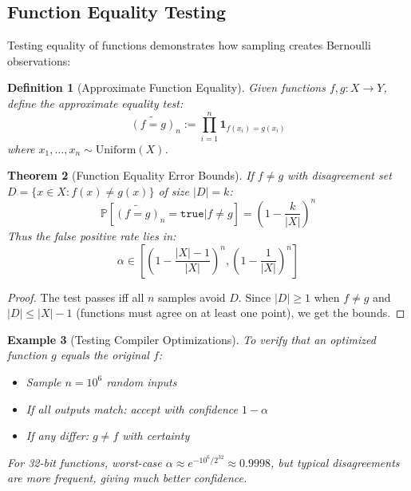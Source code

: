 \documentclass[11pt,final,hidelinks]{article}
\newtheorem{theorem}{Theorem}[section]
\newtheorem{definition}[theorem]{Definition}
\newtheorem{example}[theorem]{Example}
\newcommand{\obs}[1]{\widetilde{#1}}  %
\newcommand{\Prob}[1]{\mathbb{P}\left[#1\right]}
\newcommand{\True}{\mathtt{true}}
\begin{document}
\subsection{Function Equality Testing}

Testing equality of functions demonstrates how sampling creates Bernoulli observations:

\begin{definition}[Approximate Function Equality]
Given functions $f, g: X \to Y$, define the approximate equality test:
\begin{equation}
\obs{(f = g)}_n := \prod_{i=1}^n \mathbf{1}_{f(x_i) = g(x_i)}
\end{equation}
where $x_1, \ldots, x_n \sim \text{Uniform}(X)$.
\end{definition}

\begin{theorem}[Function Equality Error Bounds]
If $f \neq g$ with disagreement set $D = \{x \in X : f(x) \neq g(x)\}$ of size $|D| = k$:
\begin{equation}
\Prob{\obs{(f = g)}_n = \True | f \neq g} = \left(1 - \frac{k}{|X|}\right)^n
\end{equation}
Thus the false positive rate lies in:
\begin{equation}
\alpha \in \left[\left(1 - \frac{|X|-1}{|X|}\right)^n, \left(1 - \frac{1}{|X|}\right)^n\right]
\end{equation}
\end{theorem}

\begin{proof}
The test passes iff all $n$ samples avoid $D$. Since $|D| \geq 1$ when $f \neq g$ and $|D| \leq |X|-1$ (functions must agree on at least one point), we get the bounds.
\end{proof}

\begin{example}[Testing Compiler Optimizations]
To verify that an optimized function $g$ equals the original $f$:
\begin{itemize}
    \item Sample $n = 10^6$ random inputs
    \item If all outputs match: accept with confidence $1 - \alpha$
    \item If any differ: $g \neq f$ with certainty
\end{itemize}
For 32-bit functions, worst-case $\alpha \approx e^{-10^6/2^{32}} \approx 0.9998$, but typical disagreements are more frequent, giving much better confidence.
\end{example}
\end{document}
